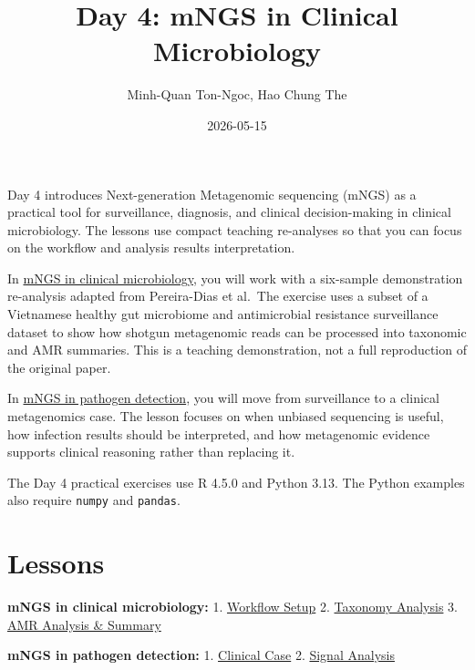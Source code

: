 \documentclass[
  letterpaper,
  DIV=11,
  numbers=noendperiod]{scrreprt}
\title{Day 4: mNGS in Clinical Microbiology}
\author{Minh-Quan Ton-Ngoc, Hao Chung The}
\date{2026-05-15}
\renewcommand*\contentsname{Table of contents}
\newcommand\contentsname{Table of contents}
\begin{document}
\maketitle

\renewcommand*\contentsname{Table of contents}
{
\setcounter{tocdepth}{2}
\tableofcontents
}

Day 4 introduces Next-generation Metagenomic sequencing (mNGS) as a
practical tool for surveillance, diagnosis, and clinical decision-making
in clinical microbiology. The lessons use compact teaching re-analyses
so that you can focus on the workflow and analysis results
interpretation.

In \href{vietnamese-healthy-gut-microbiome.qmd}{mNGS in clinical
microbiology}, you will work with a six-sample demonstration re-analysis
adapted from Pereira-Dias et al.~The exercise uses a subset of a
Vietnamese healthy gut microbiome and antimicrobial resistance
surveillance dataset to show how shotgun metagenomic reads can be
processed into taxonomic and AMR summaries. This is a teaching
demonstration, not a full reproduction of the original paper.

In \href{clinical-reasoning.qmd}{mNGS in pathogen detection}, you will
move from surveillance to a clinical metagenomics case. The lesson
focuses on when unbiased sequencing is useful, how infection results
should be interpreted, and how metagenomic evidence supports clinical
reasoning rather than replacing it.

\begin{tcolorbox}[enhanced jigsaw, arc=.35mm, bottomrule=.15mm, bottomtitle=1mm, breakable, colback=white, colbacktitle=quarto-callout-note-color!10!white, colframe=quarto-callout-note-color-frame, coltitle=black, left=2mm, leftrule=.75mm, opacityback=0, opacitybacktitle=0.6, rightrule=.15mm, title=\textcolor{quarto-callout-note-color}{\faInfo}\hspace{0.5em}{Technical note}, titlerule=0mm, toprule=.15mm, toptitle=1mm]

The Day 4 practical exercises use R 4.5.0 and Python 3.13. The Python
examples also require \texttt{numpy} and \texttt{pandas}.

\end{tcolorbox}

\chapter{Lessons}\label{lessons}

\textbf{mNGS in clinical microbiology:} 1.
\href{vietnamese-healthy-gut-microbiome.qmd}{Workflow Setup} 2.
\href{vietnamese-healthy-gut-taxonomy.qmd}{Taxonomy Analysis} 3.
\href{vietnamese-healthy-gut-amr.qmd}{AMR Analysis \& Summary}

\textbf{mNGS in pathogen detection:} 1.
\href{clinical-reasoning.qmd}{Clinical Case} 2.
\href{clinical-reasoning-analysis.qmd}{Signal Analysis}
\end{document}

